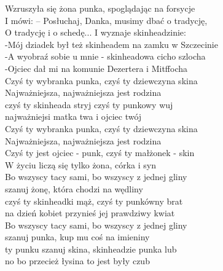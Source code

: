 \begin{text}
Wzruszyła się żona punka, spoglądając na forsycje\\
I mówi: – Posłuchaj, Danka, musimy dbać o tradycję,\\
O tradycję i o schedę... I wyznaje skinheadzinie:\\
-Mój dziadek był też skinheadem na zamku w Szczecinie\\
-A wyobraź sobie u mnie - skinheadowa cicho szlocha\\
-Ojciec dał mi na komunie Dezertera i Mitffocha\\

Czyś ty wybranka punka, czyś ty dziewczyna skina\\
Najważniejsza, najważniejsza jest rodzina\\
czyś ty skinheada stryj czyś ty punkowy wuj\\
najważniejsi matka twa i ojciec twój\\

Czyś ty wybranka punka, czyś ty dziewczyna skina\\
Najważniejsza, najważniejsza jest rodzina\\
Czyś ty jest ojciec - punk, czyś ty małżonek - skin\\
W życiu liczą się tylko żona, córka i syn \\

Bo wszyscy tacy sami, bo wszyscy z jednej gliny\\
szanuj żonę, która chodzi na wędliny\\
czyś ty skinheadki mąż, czyś ty punkówny brat\\
na dzień kobiet przynieś jej prawdziwy kwiat\\

Bo wszyscy tacy sami, bo wszyscy z jednej gliny\\
szanuj punka, kup mu coś na imieniny\\
ty punku szanuj skina, skinheadzie punka lub\\
no bo przecież łysina to jest były czub\\
\end{text}